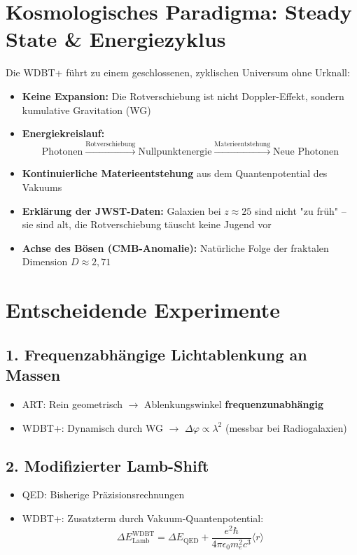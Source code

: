 \documentclass[12pt,a4paper]{article}
\begin{document}
\section*{Kosmologisches Paradigma: Steady State \& Energiezyklus}
Die WDBT+ führt zu einem geschlossenen, zyklischen Universum ohne Urknall:

\begin{itemize}
    \item \textbf{Keine Expansion:} Die Rotverschiebung ist nicht Doppler-Effekt, sondern kumulative Gravitation (WG)
    \item \textbf{Energiekreislauf:} 
    \[
    \text{Photonen} \xrightarrow{\text{Rotverschiebung}} \text{Nullpunktenergie} \xrightarrow{\text{Materieentstehung}} \text{Neue Photonen}
    \]
    \item \textbf{Kontinuierliche Materieentstehung} aus dem Quantenpotential des Vakuums
    \item \textbf{Erklärung der JWST-Daten:} Galaxien bei $z \approx 25$ sind nicht "zu früh" – sie sind alt, die Rotverschiebung täuscht keine Jugend vor
    \item \textbf{Achse des Bösen (CMB-Anomalie):} Natürliche Folge der fraktalen Dimension $D \approx 2{,}71$
\end{itemize}

\section*{Entscheidende Experimente}

\subsection*{1. Frequenzabhängige Lichtablenkung an Massen}
\begin{itemize}
    \item ART: Rein geometrisch $\rightarrow$ Ablenkungswinkel \textbf{frequenzunabhängig}
    \item WDBT+: Dynamisch durch WG $\rightarrow$ \textbf{$\Delta\varphi \propto \lambda^2$} (messbar bei Radiogalaxien)
\end{itemize}

\subsection*{2. Modifizierter Lamb-Shift}
\begin{itemize}
    \item QED: Bisherige Präzisionsrechnungen
    \item WDBT+: Zusatzterm durch Vakuum-Quantenpotential:
    \begin{equation}
    \Delta E_{\text{Lamb}}^{\text{WDBT}} = \Delta E_{\text{QED}} + \frac{e^2\hbar}{4\pi\epsilon_0 m_e^2c^3}\langle r\rangle
    \end{equation}
\end{itemize}
\end{document}
